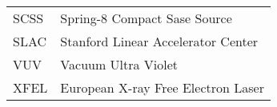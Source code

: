 \begin{tabular}{ll}
SCSS    &Spring-8 Compact Sase Source\\
SLAC    &Stanford Linear Accelerator Center\\
VUV     &Vacuum Ultra Violet\\
XFEL    &European X-ray Free Electron Laser
\end{tabular}

